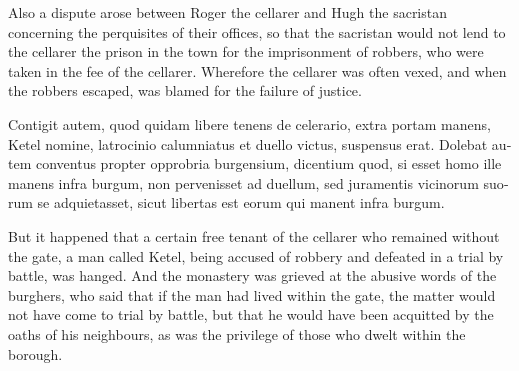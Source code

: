\documentclass{book}
\begin{document}
\begin{paracol}{2}
\begin{otherlanguage}{latin}
\end{otherlanguage}

\switchcolumn

Also a dispute arose between Roger the cellarer and Hugh the sacristan concerning the perquisites of their offices, so that the sacristan would not lend to the cellarer the prison in the town for the imprisonment of robbers, who were taken in the fee of the cellarer. Wherefore the cellarer was often vexed, and when the robbers escaped, was blamed for the failure of justice.

\switchcolumn*

\begin{otherlanguage}{latin}
Contigit autem, quod quidam libere tenens de celerario, extra portam manens, Ketel nomine, latrocinio calumniatus et duello victus, suspensus erat. Dolebat autem conventus propter opprobria burgensium, dicentium quod, si esset homo ille manens infra burgum, non pervenisset ad duellum, sed juramentis vicinorum suorum se adquietasset, sicut libertas est eorum qui manent infra burgum.
\end{otherlanguage}

\switchcolumn

But it happened that a certain free tenant of the cellarer who remained without the gate, a man called Ketel, being accused of robbery and defeated in a trial by battle, was hanged. And the monastery was grieved at the abusive words of the burghers, who said that if the man had lived within the gate, the matter would not have come to trial by battle, but that he would have been acquitted by the oaths of his neighbours, as was the privilege of those who dwelt within the borough.

\switchcolumn*


\end{paracol}
\end{document}
